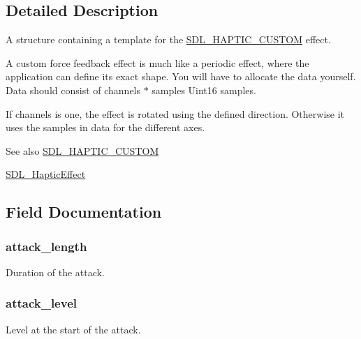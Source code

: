 \subsection{Detailed Description}
A structure containing a template for the \hyperlink{_s_d_l__haptic_8h_a8a18c4de1076ac9bebd718329d16db29}{S\+D\+L\+\_\+\+H\+A\+P\+T\+I\+C\+\_\+\+C\+U\+S\+T\+OM} effect. 

A custom force feedback effect is much like a periodic effect, where the application can define its exact shape. You will have to allocate the data yourself. Data should consist of channels $\ast$ samples Uint16 samples.

If channels is one, the effect is rotated using the defined direction. Otherwise it uses the samples in data for the different axes.

\begin{DoxySeeAlso}{See also}
\hyperlink{_s_d_l__haptic_8h_a8a18c4de1076ac9bebd718329d16db29}{S\+D\+L\+\_\+\+H\+A\+P\+T\+I\+C\+\_\+\+C\+U\+S\+T\+OM} 

\hyperlink{union_s_d_l___haptic_effect}{S\+D\+L\+\_\+\+Haptic\+Effect} 
\end{DoxySeeAlso}


\subsection{Field Documentation}
\subsubsection[{\texorpdfstring{attack\+\_\+length}{attack_length}}]{ attack\+\_\+length}\hypertarget{struct_s_d_l___haptic_custom_ac1af5d594e082747b14fa520f74764c0}{}\label{struct_s_d_l___haptic_custom_ac1af5d594e082747b14fa520f74764c0}
Duration of the attack. 
\subsubsection[{\texorpdfstring{attack\+\_\+level}{attack_level}}]{ attack\+\_\+level}\hypertarget{struct_s_d_l___haptic_custom_accde1dae084b0e3b5027c7731cde9080}{}\label{struct_s_d_l___haptic_custom_accde1dae084b0e3b5027c7731cde9080}
Level at the start of the attack. 
